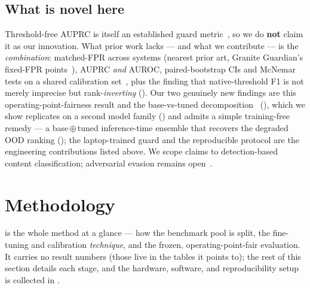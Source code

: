 \documentclass[sigconf,nonacm]{acmart}
\begin{document}
\subsection{What is novel here}

Threshold-free AUPRC is itself an established guard metric~\cite{markov2023holistic,inan2023llamaguard,zeng2024shieldgemma,padhi2024graniteguardian,kang2025r2guard}, so we do \textbf{not} claim it as our innovation. What prior work lacks --- and what we contribute --- is the \emph{combination}: matched-FPR across systems (nearest prior art, Granite Guardian's fixed-FPR points~\cite{padhi2024graniteguardian}), AUPRC \emph{and} AUROC, paired-bootstrap CIs and McNemar tests on a shared calibration set~\cite{guo2017calibration}, plus the finding that native-threshold F1 is not merely imprecise but rank-\emph{inverting} (). Our two genuinely new findings are this operating-point-fairness result and the base-vs-tuned decomposition~\cite{hsiung2025guardrails} (), which we show replicates on a second model family () and admits a simple training-free remedy --- a base\,$\oplus$\,tuned inference-time ensemble that recovers the degraded OOD ranking (); the laptop-trained guard and the reproducible protocol are the engineering contributions listed above. We scope claims to detection-based content classification; adversarial evasion remains open~\cite{hackett2025bypassing}.

\section{Methodology}
\label{sec:methodology}

 is the whole method at a glance --- how the benchmark pool is split, the fine-tuning and calibration \emph{technique}, and the frozen, operating-point-fair evaluation. It carries no result numbers (those live in the tables it points to); the rest of this section details each stage, and the hardware, software, and reproducibility setup is collected in .
\end{document}

